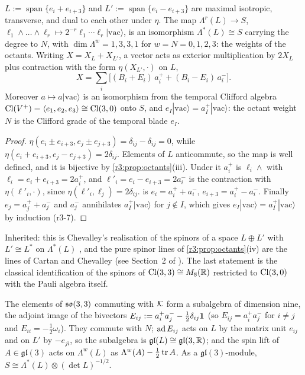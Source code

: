 \begin{proposition}
\label{r3:prop:fock}
$L:=\operatorname{span}\{e_i+e_{i+3}\}$ and $L':=\operatorname{span}\{e_i-e_{i+3}\}$ are maximal isotropic, transverse, and dual to each other
under $\eta$. The map $\Lambda^r(L)\to S$, $\ell_1\wedge\dots\wedge\ell_r\mapsto2^{-r}\ell_1\cdots\ell_r|\mathrm{vac}\rangle$, is an isomorphism
$\Lambda^*(L)\cong S$ carrying the degree to $N$, with $\dim\Lambda^w=1,3,3,1$ for $w=N=0,1,2,3$: the weights of the octants. Writing
$X=X_L+X_{L'}$, a vector acts as exterior multiplication by $2X_L$ plus contraction with the form $\eta(X_{L'},\cdot)$ on $L$,
\begin{equation}
\label{r3:eq:Xfock}
X=\sum_i\bigl[(B_i+E_i)\,a^+_i+(B_i-E_i)\,a^-_i\bigr].
\end{equation}
Moreover $a\mapsto a|\mathrm{vac}\rangle$ is an isomorphism from the temporal Clifford algebra $\mathrm{Cl}(V^+)=\langle e_1,e_2,e_3\rangle\cong\mathrm{Cl}(3,0)$ onto
$S$, and $e_I|\mathrm{vac}\rangle=a^+_I|\mathrm{vac}\rangle$: the octant weight $N$ is the Clifford grade of the temporal blade $e_I$.
\end{proposition}

\begin{proof}
$\eta(e_i\pm e_{i+3},e_j\pm e_{j+3})=\delta_{ij}-\delta_{ij}=0$, while $\eta(e_i+e_{i+3},e_j-e_{j+3})=2\delta_{ij}$. Elements of $L$ anticommute, so the
map is well defined, and it is bijective by \cref{r3:prop:octants}(iii). Under it $a^+_i$ is $\ell_i\wedge$ with $\ell_i=e_i+e_{i+3}=2a^+_i$, and
$\ell'_i=e_i-e_{i+3}=2a^-_i$ is the contraction with $\eta(\ell'_i,\cdot)$, since $\eta(\ell'_i,\ell_j)=2\delta_{ij}$.  is
$e_i=a^+_i+a^-_i$, $e_{i+3}=a^+_i-a^-_i$. Finally
$e_j=a^+_j+a^-_j$ and $a^-_j$ annihilates $a^+_I|\mathrm{vac}\rangle$ for $j\notin I$, which gives $e_I|\mathrm{vac}\rangle=a^+_I|\mathrm{vac}\rangle$ by induction (r3-7).
\end{proof}

Inherited: this is Chevalley's realisation of the spinors of a space $L\oplus L'$ with $L'\cong L^*$ on $\Lambda^*(L)$
\cite{Chevalley54,LawsonMichelsohn}, and the pure spinor lines of \cref{r3:prop:octants}(iv) are the lines of Cartan and Chevalley (see Section~2
of \cite{Gualtieri03}). The last statement is the classical identification of the spinors of $\mathrm{Cl}(3,3)\cong M_8(\mathbb{R})$ restricted to
$\mathrm{Cl}(3,0)$ with the Pauli algebra itself.

\begin{proposition}
\label{r3:prop:gl3}
The elements of $\mathfrak{so}(3,3)$ commuting with $\mathcal K$ form a subalgebra of dimension nine, the adjoint image of the bivectors
$E_{ij}:=a^+_ia^-_j-\tfrac12\delta_{ij}\mathbf 1$ (so $E_{ij}=a^+_ia^-_j$ for $i\neq j$ and $E_{ii}=-\tfrac12\omega_i$). They commute with $N$; $\operatorname{ad} E_{ij}$ acts
on $L$ by the matrix unit $e_{ij}$ and on $L'$ by $-e_{ji}$, so the subalgebra is $\mathfrak{gl}(L)\cong\mathfrak{gl}(3,\mathbb{R})$; and the spin lift of
$A\in\mathfrak{gl}(3)$ acts on $\Lambda^w(L)$ as $\Lambda^w(A)-\tfrac12\operatorname{tr} A$. As a $\mathfrak{gl}(3)$-module, $S\cong\Lambda^*(L)\otimes(\det L)^{-1/2}$.
\end{proposition}

